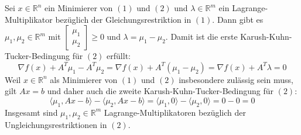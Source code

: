 \begin{compactenum}[(i)]
\item Sei $x\in\mathbb R^n$ ein Minimierer von $(1)$ und $(2)$ und $\lambda\in\mathbb R^m$ ein Lagrange-Multiplikator bezüglich der Gleichungsrestriktion in $(1)$. Dann gibt es $\mu_1,\mu_2\in\mathbb R^m$ mit $\begin{bmatrix}\mu_1\\\mu_2\end{bmatrix}\geq 0$ und $\lambda = \mu_1-\mu_2$. Damit ist die erste Karush-Kuhn-Tucker-Bedingung für $(2)$ erfüllt:
$$\nabla f(x)+A^T\mu_1-A^T\mu_2=\nabla f(x)+A^T(\mu_1-\mu_2)=\nabla f(x)+A^T\lambda=0$$
Weil $x\in\mathbb R^n$ als Minimierer von $(1)$ und $(2)$ insbesondere zulässig sein muss, gilt $Ax=b$ und daher auch die zweite Karush-Kuhn-Tucker-Bedingung für $(2)$:
$$\langle \mu_1,Ax-b\rangle-\langle \mu_2,Ax-b\rangle=\langle \mu_1,0\rangle-\langle \mu_2,0\rangle=0-0=0$$
Insgesamt sind $\mu_1,\mu_2\in\mathbb R^m$ Lagrange-Multiplikatoren bezüglich der Ungleichungsrestriktionen in $(2)$.
\end{compactenum}